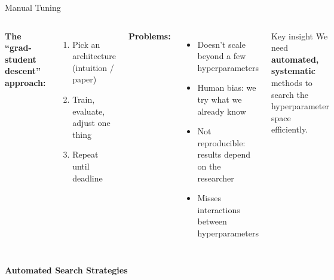 \documentclass[aspectratio=169,11pt]{beamer}
\newcommand{\emphc}[1]{\textcolor{harvardcrimson}{#1}}
\begin{document}
\begin{frame}{Manual Tuning}
\begin{columns}[T]
\textbf{The ``grad-student descent'' approach:}
\begin{enumerate}
    \item Pick an architecture (intuition / paper)
    \item Train, evaluate, adjust one thing
    \item Repeat until deadline
\end{enumerate}

\vspace{0.3cm}
\textbf{Problems:}
\begin{itemize}
    \item \emphc{Doesn't scale} beyond a few hyperparameters
    \item \emphc{Human bias}: we try what we already know
    \item \emphc{Not reproducible}: results depend on the researcher
    \item Misses interactions between hyperparameters
\end{itemize}

\vspace{0.5cm}
\begin{block}{Key insight}
We need \textbf{automated, systematic} methods to search the hyperparameter space efficiently.
\end{block}
\end{columns}
\end{frame}


{
\begin{frame}[plain,c]
\begin{center}
{\Huge\bfseries Automated Search Strategies}
\end{center}
\end{frame}
}
\end{document}
